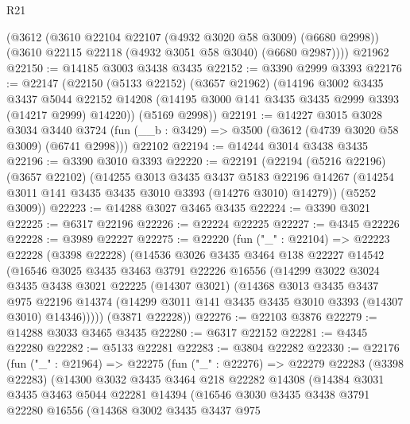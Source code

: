 \begin{lexlean}{R21}
\begin{coremodule}
      (@3612
        (@3610 @22104 @22107 (@4932 @3020 @58 @3009) (@6680 @2998))
        (@3610 @22115 @22118 (@4932 @3051 @58 @3040) (@6680 @2987))))
    @21962
@22150 := @14185 @3003 @3438 @3435
@22152 := @3390 @2999 @3393
@22176 := @22147
    (@22150
      (@5133 @22152)
      (@3657 @21962)
      (@14196
        @3002
        @3435
        @3437
        @5044
        @22152
        @14208
        (@14195 @3000 @141 @3435 @3435 @2999 @3393 (@14217 @2999) @14220))
      (@5169 @2998))
@22191 := @14227
    @3015
    @3028
    @3034
    @3440
    @3724
    (fun (__b : @3429) => @3500 (@3612 (@4739 @3020 @58 @3009) (@6741 @2998)))
    @22102
@22194 := @14244 @3014 @3438 @3435
@22196 := @3390 @3010 @3393
@22220 := @22191
    (@22194
      (@5216 @22196)
      (@3657 @22102)
      (@14255
        @3013
        @3435
        @3437
        @5183
        @22196
        @14267
        (@14254 @3011 @141 @3435 @3435 @3010 @3393 (@14276 @3010) @14279))
      (@5252 @3009))
@22223 := @14288 @3027 @3465 @3435
@22224 := @3390 @3021
@22225 := @6317 @22196
@22226 := @22224 @22225
@22227 := @4345 @22226
@22228 := @3989 @22227
@22275 := @22220
    (fun ("_" : @22104) =>
    @22223
      @22228
      (@3398 @22228)
      (@14536
        @3026
        @3435
        @3464
        @138
        @22227
        @14542
        (@16546
          @3025
          @3435
          @3463
          @3791
          @22226
          @16556
          (@14299
            @3022
            @3024
            @3435
            @3438
            @3021
            @22225
            (@14307 @3021)
            (@14368
              @3013
              @3435
              @3437
              @975
              @22196
              @14374
              (@14299 @3011 @141 @3435 @3435 @3010 @3393 (@14307 @3010) @14346)))))
      (@3871 @22228))
@22276 := @22103 @3876
@22279 := @14288 @3033 @3465 @3435
@22280 := @6317 @22152
@22281 := @4345 @22280
@22282 := @5133 @22281
@22283 := @3804 @22282
@22330 := @22176
    (fun ("_" : @21964) =>
    @22275
      (fun ("_" : @22276) =>
      @22279
        @22283
        (@3398 @22283)
        (@14300
          @3032
          @3435
          @3464
          @218
          @22282
          @14308
          (@14384
            @3031
            @3435
            @3463
            @5044
            @22281
            @14394
            (@16546
              @3030
              @3435
              @3438
              @3791
              @22280
              @16556
              (@14368
                @3002
                @3435
                @3437
                @975

\end{coremodule}
\end{lexlean}
